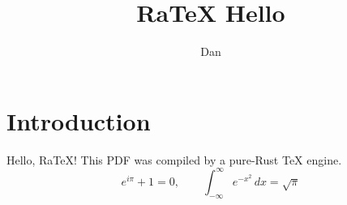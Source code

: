 \documentclass{article}
\title{RaTeX Hello}
\author{Dan}
\begin{document}
\maketitle
\section{Introduction}
Hello, RaTeX! This PDF was compiled by a pure-Rust TeX engine.
\begin{equation}
  e^{i\pi} + 1 = 0, \qquad \int_{-\infty}^{\infty} e^{-x^2}\,dx = \sqrt{\pi}
\end{equation}
\end{document}
